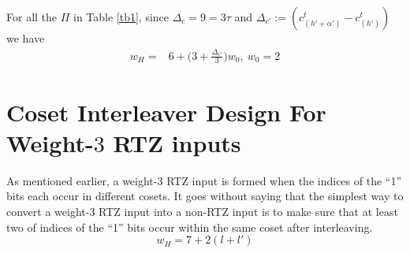 \documentclass[11pt, oneside, dvipdfmx]{book}
\begin{document}
For all the $\Pi$ in Table \ref{tb1}, since $\Delta_c = 9=3\tau$ and $\Delta_{c'}:=(c_{(h'+\alpha')}^{t}-c_{(h')}^{t})$  we have
\begin{equation}
\begin{split}
w_H=&6+\Big(3+\frac{\Delta_{c'}}{3}\Big)w_0,~w_0=2
\end{split}
\label{eq4}
\end{equation}








\section{Coset Interleaver Design For Weight-$3$ RTZ inputs}
As mentioned earlier, a weight-$3$ RTZ input is formed when the indices of the ``1'' bits each occur in different cosets.  It goes without saying that the simplest way to convert a weight-$3$ RTZ input into a non-RTZ input is to make sure that at least two of indices of the ``1'' bits occur within the same coset after interleaving.
\begin{equation}
w_H=
7+2(l+l') 
\label{eq6}
\end{equation}
\end{document}
